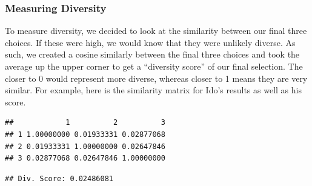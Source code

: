 \documentclass[
]{article}
\begin{document}
\hypertarget{measuring-diversity}{%
\subsubsection{Measuring Diversity}\label{measuring-diversity}}

To measure diversity, we decided to look at the similarity between our
final three choices. If these were high, we would know that they were
unlikely diverse. As such, we created a cosine similarly between the
final three choices and took the average up the upper corner to get a
``diversity score'' of our final selection. The closer to 0 would
represent more diverse, whereas closer to 1 means they are very similar.
For example, here is the similarity matrix for Ido's results as well as
his score.

\begin{verbatim}
##            1          2          3
## 1 1.00000000 0.01933331 0.02877068
## 2 0.01933331 1.00000000 0.02647846
## 3 0.02877068 0.02647846 1.00000000
\end{verbatim}

\begin{verbatim}
## Div. Score: 0.02486081
\end{verbatim}
\end{document}
